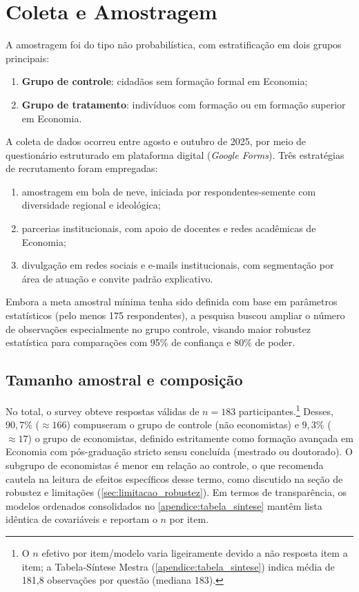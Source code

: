 \section{Coleta e Amostragem}\label{sec:coleta-amostragem}

A amostragem foi do tipo não probabilística, com estratificação em dois grupos principais:
\begin{enumerate}[label=\alph*)]
    \item \textbf{Grupo de controle}: cidadãos sem formação formal em Economia;
    \item \textbf{Grupo de tratamento}: indivíduos com formação ou em formação superior em Economia.
\end{enumerate}

A coleta de dados ocorreu entre agosto e outubro de 2025, por meio de questionário estruturado em plataforma digital (\textit{Google Forms}). Três estratégias de recrutamento foram empregadas:
\begin{enumerate}[label=\alph*)]
    \item amostragem em bola de neve, iniciada por respondentes-semente com diversidade regional e ideológica;
    \item parcerias institucionais, com apoio de docentes e redes acadêmicas de Economia;
    \item divulgação em redes sociais e e-mails institucionais, com segmentação por área de atuação e convite padrão explicativo.
\end{enumerate}

Embora a meta amostral mínima tenha sido definida com base em parâmetros estatísticos (pelo menos 175 respondentes), a pesquisa buscou ampliar o número de observações especialmente no grupo controle, visando maior robustez estatística para comparações com 95\% de confiança e 80\% de poder.

\subsection{Tamanho amostral e composição}
No total, o survey obteve respostas válidas de \(n = 183\) participantes.\footnote{O \(n\) efetivo por item/modelo varia ligeiramente devido a não resposta item a item; a Tabela-Síntese Mestra (\autoref{apendice:tabela_sintese}) indica média de 181{,}8 observações por questão (mediana 183).}
Desses, \(90{,}7\%\) (\(\approx 166\)) compuseram o grupo de controle (não economistas) e \(9{,}3\%\) (\(\approx 17\)) o grupo de economistas, definido estritamente como formação avançada em Economia com pós-graduação stricto sensu concluída (mestrado ou doutorado).
O subgrupo de economistas é menor em relação ao controle, o que recomenda cautela na leitura de efeitos específicos desse termo, como discutido na seção de robustez e limitações (\autoref{sec:limitacao_robustez}). Em termos de transparência, os modelos ordenados consolidados no \autoref{apendice:tabela_sintese} mantêm lista idêntica de covariáveis e reportam o \(n\) por item.

